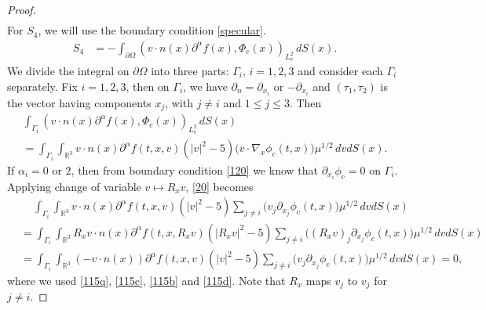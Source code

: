 \documentclass[reqno,a4paper]{amsart}
\numberwithin{equation}{section}
\newcommand{\1}{\mathbf{1}}
\newcommand{\R}{\mathbb{R}}
\newcommand{\pa}{\partial}
\newcommand{\<}{\langle}
\renewcommand{\>}{\rangle}
\begin{document}
\begin{proof}
\begin{align*}
		\end{align*}
		For $S_4$, we will use the boundary condition \eqref{specular}. 
	\begin{align*}
		S_4 &= -\int_{\partial\Omega}(v\cdot n(x){\partial^\alpha f}(x),{\Phi_c}(x))_{L^2_v}\,dS(x).
	\end{align*}
 We divide the integral on $\partial\Omega$ into three parts: $\Gamma_i$, $i=1,2,3$ and consider each $\Gamma_i$ separately. Fix $i=1,2,3$, then on $\Gamma_i$, we have $\partial_{n} = \partial_{x_i}$ or $-\pa_{x_i}$ and $(\tau_1,\tau_2)$ is the vector having components $x_j$, with $j\neq i$ and $1\le j\le 3$. Then 
 \begin{multline}
 	\int_{\Gamma_i}(v\cdot n(x){\partial^\alpha f}(x),{\Phi_c}(x))_{L^2_v}\,dS(x)\\
 	= \int_{\Gamma_i}\int_{\R^3}v\cdot n(x){\partial^\alpha f}(t,x,v)(|v|^2-5)\big(v\cdot{\nabla_{x}\phi_c}(t,x)\big)\mu^{1/2}\,dvdS(x).\label{20}
 \end{multline}
If $\alpha_i=0$ or $2$, then from boundary condition \eqref{120} we know that $\pa_{x_i}\phi_c=0$ on $\Gamma_i$. Applying change of variable $v\mapsto R_xv$, \eqref{20} becomes 
	\begin{align*}
		&\quad\,\int_{\Gamma_i}\int_{\R^3}v\cdot n(x){\partial^\alpha f}(t,x,v)(|v|^2-5)\sum_{j\neq i}\big(v_j\pa_{x_j}\phi_c(t,x)\big)\mu^{1/2}\,dvdS(x)\\
		&=\int_{\Gamma_i}\int_{\R^3}R_xv\cdot n(x){\partial^\alpha f}(t,x,R_xv)(|R_xv|^2-5)\sum_{j\neq i}\big((R_xv)_j\pa_{x_j}\phi_c(t,x)\big)\mu^{1/2}\,dvdS(x)\\
		&=\int_{\Gamma_i}\int_{\R^3}(-v\cdot n(x)){\partial^\alpha f}(t,x,v)(|v|^2-5)\sum_{j\neq i}\big(v_j\pa_{x_j}\phi_c(t,x)\big)\mu^{1/2}\,dvdS(x) = 0,
	\end{align*}where we used \eqref{115q}, \eqref{115c}, \eqref{115b} and \eqref{115d}. Note that $R_x$ maps $v_j$ to $v_j$ for $j\neq i$. 


\end{proof}
\end{document}
